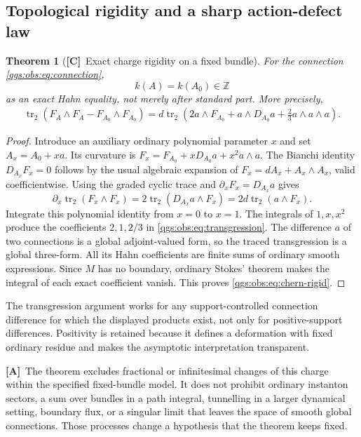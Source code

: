 \documentclass[11pt,oneside]{article}
\numberwithin{equation}{section}
\theoremstyle{plain}
\newtheorem{theorem}{Theorem}[section]
\theoremstyle{definition}
\theoremstyle{remark}
\newcommand{\Z}{\mathbb Z}
\DeclareMathOperator{\tr}{tr}
\newcommand{\TC}{\textcolor{TierC}{\textsf{\bfseries[C]}}}
\newcommand{\TA}{\textcolor{TierA}{\textsf{\bfseries[A]}}}
\begin{document}
\subsection{Topological rigidity and a sharp action-defect law}
\begin{theorem}[\TC\ Exact charge rigidity on a fixed bundle]\label{qgs:obs:thm:chern}
For the connection \eqref{qgs:obs:eq:connection},
\begin{equation}\label{qgs:obs:eq:chern-rigid}
 k(A)=k(A_0)\in\Z
\end{equation}
as an exact Hahn equality, not merely after standard part. More precisely,
\begin{align}\label{qgs:obs:eq:transgression}
 \tr_2(F_A\wedge F_A-F_{A_0}\wedge F_{A_0})
 =d\tr_2\left(2a\wedge F_{A_0}
 +a\wedge D_{A_0}a+\frac23a\wedge a\wedge a\right).
\end{align}
\end{theorem}
\begin{proof}
Introduce an auxiliary ordinary polynomial parameter $x$ and set $A_x=A_0+xa$. Its curvature is $F_x=F_{A_0}+xD_{A_0}a+x^2a\wedge a$. The Bianchi identity $D_{A_x}F_x=0$ follows by the usual algebraic expansion of $F_x=dA_x+A_x\wedge A_x$, valid coefficientwise. Using the graded cyclic trace and $\partial_xF_x=D_{A_x}a$ gives
\[
 \partial_x\tr_2(F_x\wedge F_x)
 =2\tr_2(D_{A_x}a\wedge F_x)
 =2d\tr_2(a\wedge F_x).
\]
Integrate this polynomial identity from $x=0$ to $x=1$. The integrals of $1,x,x^2$ produce the coefficients $2,1,2/3$ in \eqref{qgs:obs:eq:transgression}. The difference $a$ of two connections is a global adjoint-valued form, so the traced transgression is a global three-form. All its Hahn coefficients are finite sums of ordinary smooth expressions. Since $M$ has no boundary, ordinary Stokes' theorem makes the integral of each exact coefficient vanish. This proves \eqref{qgs:obs:eq:chern-rigid}.
\end{proof}

The transgression argument works for any support-controlled connection difference for which the displayed products exist, not only for positive-support differences. Positivity is retained because it defines a deformation with fixed ordinary residue and makes the asymptotic interpretation transparent.

\TA\ The theorem excludes fractional or infinitesimal changes of this charge within the specified fixed-bundle model. It does not prohibit ordinary instanton sectors, a sum over bundles in a path integral, tunnelling in a larger dynamical setting, boundary flux, or a singular limit that leaves the space of smooth global connections. Those processes change a hypothesis that the theorem keeps fixed.
\end{document}
